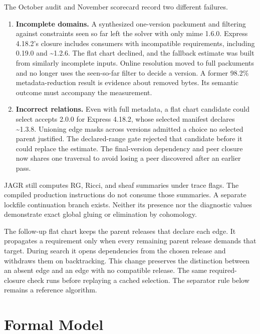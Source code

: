 \documentclass[
  11pt,
  letterpaper,
]{article}
\providecommand{\tightlist}{%
  \setlength{\itemsep}{0pt}\setlength{\parskip}{0pt}}
\begin{document}
The October audit and November scorecard record two different failures.

\begin{enumerate}
\def\labelenumi{\arabic{enumi}.}
\tightlist
\item
  \textbf{Incomplete domains.} A synthesized one-version packument and
  filtering against constraints seen so far left the solver with only
  mime 1.6.0. Express 4.18.2's closure includes consumers with
  incompatible requirements, including 0.19.0 and \textasciitilde1.2.6.
  The flat chart declined, and the fallback estimate was built from
  similarly incomplete inputs. Online resolution moved to full
  packuments and no longer uses the seen-so-far filter to decide a
  version. A former 98.2\% metadata-reduction result is evidence about
  removed bytes. Its semantic outcome must accompany the measurement.
\item
  \textbf{Incorrect relations.} Even with full metadata, a flat chart
  candidate could select accepts 2.0.0 for Express 4.18.2, whose
  selected manifest declares \textasciitilde1.3.8. Unioning edge masks
  across versions admitted a choice no selected parent justified. The
  declared-range gate rejected that candidate before it could replace
  the estimate. The final-version dependency and peer closure now shares
  one traversal to avoid losing a peer discovered after an earlier pass.
\end{enumerate}

JAGR still computes RG, Ricci, and sheaf summaries under trace flags.
The compiled production instructions do not consume those summaries. A
separate lockfile continuation branch exists. Neither its presence nor
the diagnostic values demonstrate exact global gluing or elimination by
cohomology.

The follow-up flat chart keeps the parent releases that declare each
edge. It propagates a requirement only when every remaining parent
release demands that target. During search it opens dependencies from
the chosen release and withdraws them on backtracking. This change
preserves the distinction between an absent edge and an edge with no
compatible release. The same required-closure check runs before
replaying a cached selection. The separator rule below remains a
reference algorithm.

\section{Formal Model}\label{formal-model}
\end{document}
